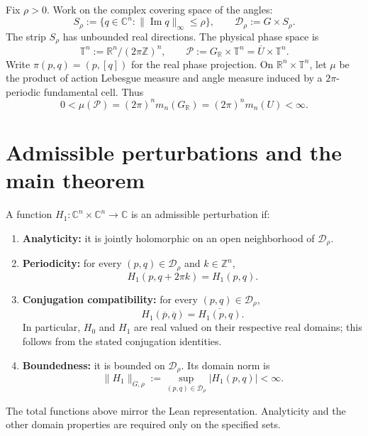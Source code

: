 \documentclass[11pt,a4paper]{article}
\newcommand{\R}{\mathbb R}
\newcommand{\C}{\mathbb C}
\newcommand{\Z}{\mathbb Z}
\newcommand{\T}{\mathbb T}
\newcommand{\norm}[1]{\lVert #1\rVert}
\newcommand{\Gr}{G_{\R}}
\newcommand{\DD}{\mathcal D}
\newcommand{\PP}{\mathcal P}
\begin{document}
Fix \(\rho>0\). Work on the complex covering space of the angles:
\[
 S_\rho:=\{q\in\C^n:\norm{\operatorname{Im}q}_\infty\le\rho\},
 \qquad \DD_\rho:=G\times S_\rho.
\]
The strip \(S_\rho\) has unbounded real directions. The physical phase space is
\[
 \T^n:=\R^n/(2\pi\Z)^n,\qquad
 \PP:=\Gr\times\T^n=\overline U\times\T^n.
\]
Write \(\pi(p,q)=(p,[q])\) for the real phase projection. On
\(\R^n\times\T^n\), let \(\mu\) be the product of action Lebesgue measure
and angle measure induced by a \(2\pi\)-periodic fundamental cell. Thus
\[
 0<\mu(\PP)=(2\pi)^n m_n(\Gr)=(2\pi)^n m_n(U)<\infty.
\]

\newpage
\section{Admissible perturbations and the main theorem}

A function \(H_1:\C^n\times\C^n\to\C\) is an admissible perturbation if:
\begin{enumerate}[label=\textup{(P\arabic*)}]
\item \textbf{Analyticity:} it is jointly holomorphic on an open neighborhood
of \(\DD_\rho\).
\item \textbf{Periodicity:} for every \((p,q)\in\DD_\rho\) and \(k\in\Z^n\),
\[
 H_1(p,q+2\pi k)=H_1(p,q).
\]
\item \textbf{Conjugation compatibility:} for every \((p,q)\in\DD_\rho\),
\[
 H_1(\overline p,\overline q)=\overline{H_1(p,q)}.
\]
In particular, \(H_0\) and \(H_1\) are real valued on their respective real
domains; this follows from the stated conjugation identities.
\item \textbf{Boundedness:} it is bounded on \(\DD_\rho\). Its domain norm is
\[
 \norm{H_1}_{G,\rho}:=\sup_{(p,q)\in\DD_\rho}|H_1(p,q)|<\infty.
\]
\end{enumerate}
The total functions above mirror the Lean representation. Analyticity and
the other domain properties are required only on the specified sets.
\end{document}
